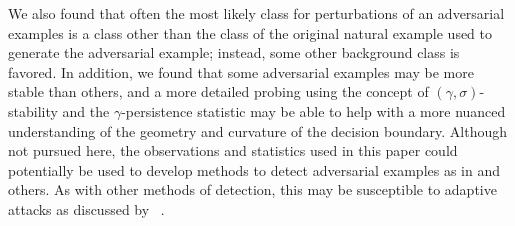 We also found that often the most likely class for perturbations of an adversarial examples is a class other than the class of the original natural example used to generate the adversarial example; instead, some other background class is favored. In addition, we found that some adversarial examples may be more stable than others, and a more detailed probing using the concept of $(\gamma,\sigma)$-stability and the $\gamma$-persistence statistic may be able to help with a more nuanced understanding of the geometry and curvature of the decision boundary. Although not pursued here, the observations and statistics used in this paper could potentially be used to develop methods to detect adversarial examples as in \cite{crecchi2019,frosst2018,hosseini2019odds,Lee2018ASU,qin2020,roth19aodds} and others. As with other methods of detection, this may be susceptible to adaptive attacks as discussed by ~\cite{tramer2020adaptive}. 





